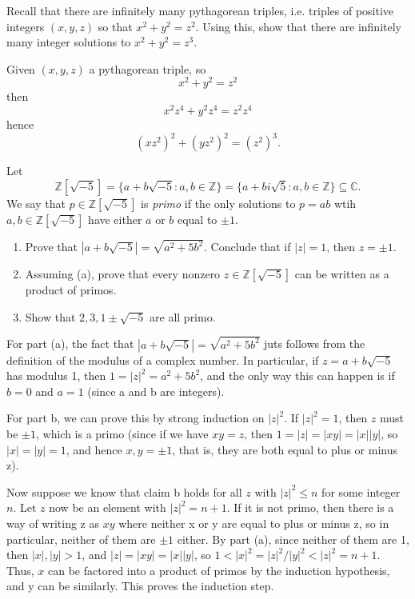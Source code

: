 \documentclass[11pt,dvipsnames]{book}
\def\Z{\mathbb{Z}}
\def\C{{\mathbb{C}}}
\numberwithin{equation}{section} %
\numberwithin{figure}{section} %
\numberwithin{table}{section} %
\begin{document}
\begin{exercise}
Recall that there are infinitely many pythagorean triples, i.e. triples of positive integers $(x,y,z)$ so that $x^2+y^2=z^2$. Using this, show that there are infinitely many integer solutions to $x^2+y^2=z^3$. 

\begin{solution}
Given $(x,y,z)$ a pythagorean triple, so
\[
x^2+y^2=z^2\]
then
\[
x^2z^4+ y^2 z^4 = z^2 z^4
\]
hence
\[
(xz^2)^2+(yz^2)^2 = (z^2)^3.
\]
\end{solution}
\end{exercise}

\begin{exercise} Let 
\[
\Z[\sqrt{-5}]=\{a+b\sqrt{-5}: a,b\in\Z\} = \{a+bi\sqrt{5}: a,b\in\Z\}\subseteq \C.
\]
We say that $p\in \Z[\sqrt{-5}]$ is {\it primo} if the only solutions to $p=ab$ wtih $a,b\in \Z[\sqrt{-5}]$ have either $a$ or $b$ equal to $\pm 1$. 

 \begin{enumerate}[label=(\alph*)]
\item Prove that $|a+b\sqrt{-5}|=\sqrt{a^2+5b^2}$. Conclude that if $|z|=1$, then $z=\pm 1$. 
\item Assuming (a), prove that every nonzero $z\in\Z[\sqrt{-5}]$ can be written as a product of primos. 
\item Show that $2,3,1\pm\sqrt{-5}$ are all primo. 

\end{enumerate}

\begin{solution}
For part (a), the fact that $|a+b\sqrt{-5}|=\sqrt{a^{2}+5b^{2}}$ juts follows from the definition of the modulus of a complex number. In particular, if $z=a+b\sqrt{-5}$ has modulus 1, then $1=|z|^{2}=a^{2}+5b^{2}$, and the only way this can happen is if $b=0$ and $a=1$ (since a and b are integers).


For part b, we can prove this by strong induction on $|z|^2$. If $|z|^2=1$, then $z$ must be $\pm 1$, which is a primo (since if we have $xy=z$, then $1=|z|=|xy|=|x||y|$, so $|x|=|y|=1$, and hence $x,y=\pm 1$, that is, they are both equal to plus or minus z).


Now suppose we know that claim b holds for all $z$ with $|z|^2\leq n$ for some integer $n$. Let $z$ now be an element with $|z|^2=n+1$. If it is not primo, then there is a way of writing z as $xy$ where neither x or y are equal to plus or  minus z, so in particular, neither of them are $\pm 1$ either. By part (a), since neither of them are 1, then $|x|,|y|>1$, and $|z|=|xy|=|x||y|$, so $1<|x|^2=|z|^2/|y|^2<|z|^2=n+1$. Thus, $x$ can be factored into a product of primos by the induction hypothesis, and y can be similarly. This proves the induction step.



\end{solution}
\end{exercise}
\end{document}
